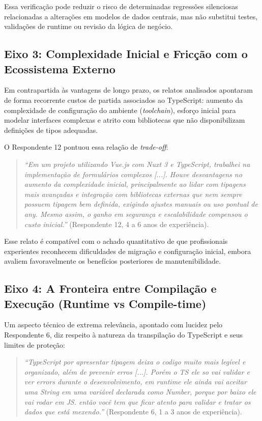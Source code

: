 Essa verificação pode reduzir o risco de determinadas regressões silenciosas relacionadas a alterações em modelos de dados centrais, mas não substitui testes, validações de runtime ou revisão da lógica de negócio.

\subsection{Eixo 3: Complexidade Inicial e Fricção com o Ecossistema Externo}

Em contrapartida às vantagens de longo prazo, os relatos analisados apontaram de forma recorrente custos de partida associados ao TypeScript: aumento da complexidade de configuração do ambiente (\textit{toolchain}), esforço inicial para modelar interfaces complexas e atrito com bibliotecas que não disponibilizam definições de tipos adequadas.

O Respondente 12 pontuou essa relação de \textit{trade-off}:
\begin{quote}
\textit{``Em um projeto utilizando Vue.js com Nuxt 3 e TypeScript, trabalhei na implementação de formulários complexos [...]. Houve desvantagens no aumento da complexidade inicial, principalmente ao lidar com tipagens mais avançadas e integração com bibliotecas externas que nem sempre possuem tipagem bem definida, exigindo ajustes manuais ou uso pontual de any. Mesmo assim, o ganho em segurança e escalabilidade compensou o custo inicial.''} (Respondente 12, 4 a 6 anos de experiência).
\end{quote}

Esse relato é compatível com o achado quantitativo de que profissionais experientes reconhecem dificuldades de migração e configuração inicial, embora avaliem favoravelmente os benefícios posteriores de manutenibilidade.

\subsection{Eixo 4: A Fronteira entre Compilação e Execução (Runtime vs Compile-time)}

Um aspecto técnico de extrema relevância, apontado com lucidez pelo Respondente 6, diz respeito à natureza da transpilação do TypeScript e seus limites de proteção:
\begin{quote}
\textit{``TypeScript por apresentar tipagem deixa o codigo muito mais legível e organizado, além de prevenir erros [...]. Porém o TS ele so vai validar e ver errors durante o desenvolvimento, em runtime ele ainda vai aceitar uma String em uma variável declarada como Number, porque por baixo ele vai rodar em JS. então você tem que ficar atento para validar e tratar os dados que está mexendo.''} (Respondente 6, 1 a 3 anos de experiência).
\end{quote}

